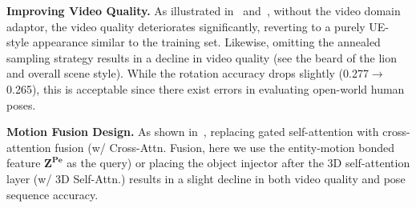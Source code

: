 \noindent \textbf{Improving Video Quality.} As illustrated in~ and~, without the video domain adaptor, the video quality deteriorates significantly, reverting to a purely UE-style appearance similar to the training set. Likewise, omitting the annealed sampling strategy results in a decline in video quality (see the beard of the lion and overall scene style). While the rotation accuracy drops slightly (0.277$\rightarrow$0.265), this is acceptable since there exist errors in evaluating open-world human poses.

\noindent \textbf{Motion Fusion Design.} As shown in~, replacing gated self-attention with cross-attention fusion (w/ Cross-Attn. Fusion, here we use the entity-motion bonded feature $\mathbf{Z}^\mathbf{Pe}$ as the query) or placing the object injector after the 3D self-attention layer (w/ 3D Self-Attn.) results in a slight decline in both video quality and pose sequence accuracy.

